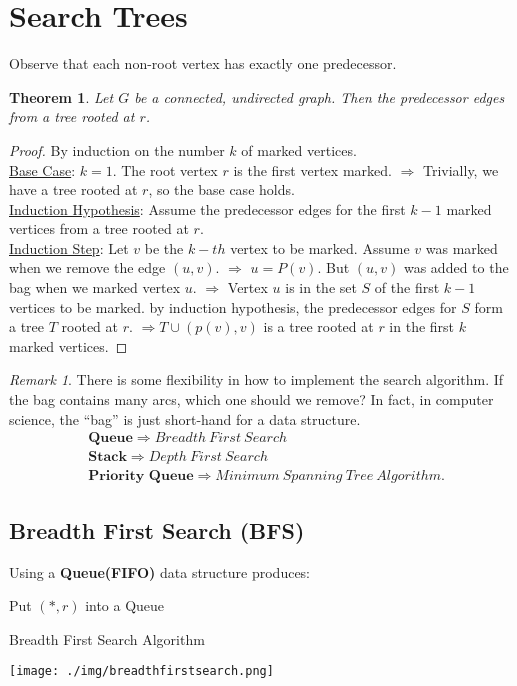 \documentclass[11pt, a4paper, oneside]{book}
\theoremstyle{theoremdd}
\newtheorem{theorem}{Theorem}[chapter]
\theoremstyle{remark}
\newtheorem*{remark}{Remark}
\begin{document}
\section*{Search Trees}
Observe that each non-root vertex has exactly one predecessor. 
\begin{theorem}
Let $G$ be a connected, undirected graph. Then the predecessor edges from a tree rooted at $r$. 
\end{theorem}
\begin{proof}
By induction on the number $k$ of marked vertices. \\
\underline{Base Case}: $k=1$. The root vertex $r$ is the first vertex marked. $\Rightarrow$ Trivially, we have a tree rooted at $r$, so the base case holds. \\
\underline{Induction Hypothesis}: Assume the predecessor edges for the first $k-1$ marked vertices from a tree rooted at $r$. \\
\underline{Induction Step}: Let $v$ be the $k-th$ vertex to be marked. Assume $v$ was marked when we remove the edge $(u,v)$. $\Rightarrow$ $u=P(v)$. But $(u,v)$ was added to the bag when we marked vertex $u$. $\Rightarrow$ Vertex $u$ is in the set $S$ of the first $k-1$ vertices to be marked. by induction hypothesis, the predecessor edges for $S$ form a tree $T$ rooted at $r$. $\Rightarrow T\cup (p(v),v)$ is a tree rooted at $r$ in the first $k$ marked vertices. 
\end{proof}
\begin{remark}
There is some flexibility in how to implement the search algorithm. If the bag contains many arcs, which one should we remove? In fact, in computer science, the ``bag'' is just short-hand for a data structure. 
\begin{align*}
& \textbf{Queue} \Rightarrow Breadth \ First \ Search \\&
  \textbf{Stack} \Rightarrow Depth \ First \ Search \\&
  \textbf{Priority Queue} \Rightarrow Minimum \ Spanning \ Tree \ Algorithm.
\end{align*}
\end{remark}

\subsection*{Breadth First Search (BFS)}
Using a \textbf{Queue(FIFO)} data structure produces: 
\begin{algorithm}
\SetAlgoLined
{}
Put $(*,r)$ into a Queue\;
\caption{Breadth First Search Algorithm}
\end{algorithm}
\begin{center}
\texttt{[image: ./img/breadthfirstsearch.png]}
\end{center}
\end{document}
